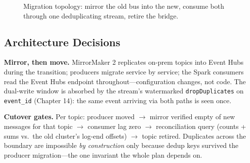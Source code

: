 \begin{figure}[H]
    \centering
    \caption{Migration topology: mirror the old bus into the new, consume both through one deduplicating stream, retire the bridge.}
    \label{fig:ch15-migration}
\end{figure}

\subsection{Architecture Decisions}
\textbf{Mirror, then move.} MirrorMaker 2 replicates on-prem topics into Event Hubs during the transition; producers migrate service by service; the Spark consumers read the Event Hubs endpoint throughout---configuration changes, not code. The dual-write window is absorbed by the stream's watermarked \texttt{dropDuplicates} on \texttt{event\_id} (Chapter 14): the same event arriving via both paths is seen once.

\textbf{Cutover gates.} Per topic: producer moved $\rightarrow$ mirror verified empty of new messages for that topic $\rightarrow$ consumer lag zero $\rightarrow$ reconciliation query (counts + sums vs.\ the old cluster's log-end offsets) $\rightarrow$ topic retired. Duplicates across the boundary are impossible \emph{by construction} only because dedup keys survived the producer migration---the one invariant the whole plan depends on.

